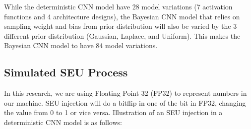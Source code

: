 While the deterministic CNN model have 28 model variations (7 activation functions and 4 architecture designs), the Bayesian CNN model that relies on sampling weight and bias from prior distribution will also be varied by the 3 different prior distribution (Gaussian, Laplace, and Uniform). This makes the Bayesian CNN model to have 84 model variations.

\subsection{Simulated SEU Process}


In this research, we are using Floating Point 32 (FP32) to represent numbers in our machine. SEU injection will do a bitflip in one of the bit in FP32, changing the value from 0 to 1 or vice versa. Illustration of an SEU injection in a deterministic CNN model is as follows:


